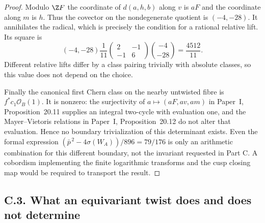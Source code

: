\begin{proof}
Modulo $\Z F$ the coordinate of $d(a,h,b)$ along $v$ is $aF$
and the coordinate along $m$ is $h$. Thus the covector on the
nondegenerate quotient is $(-4,-28)$. It annihilates the radical,
which is precisely the condition for a rational relative lift.
Its square is
\[
 (-4,-28)\frac1{11}
 \begin{pmatrix}2&-1\\-1&6\end{pmatrix}
 \binom{-4}{-28}=\frac{4512}{11}.
\]
Different relative lifts differ by a class pairing trivially with
absolute classes, so this value does not depend on the choice.

Finally the canonical first Chern class on the nearby untwisted
fibre is $f^*c_1\mathcal O_B(1)$. It is nonzero: the surjectivity of
$a\mapsto(aF,av,am)$ in Paper~I, Proposition~20.11 supplies an integral two-cycle with
evaluation one, and the Mayer--Vietoris relations in Paper~I, Proposition~20.12 do not
alter that evaluation. Hence no boundary trivialization of this
determinant exists. Even the formal expression
$(\bar p^{\,2}-4\sigma(W_A))/896=79/176$ is only an arithmetic
combination for this different boundary, not the invariant requested
in Part C. A cobordism implementing the finite logarithmic transforms
and the cusp closing map would be required to transport the result.
\end{proof}

\subsection{C.3. What an equivariant twist does and does not determine}

